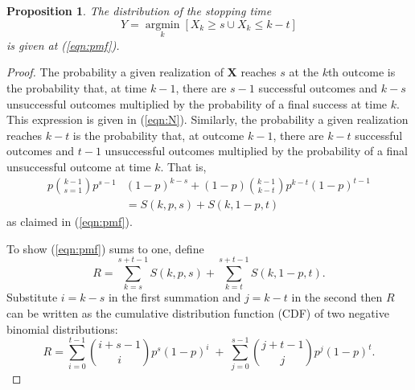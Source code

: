 \documentclass[12pt]{article}
\DeclareMathOperator*{\argmin}{argmin}
\newcommand*{\argminl}{\argmin\limits}
\newtheorem{prop}{Proposition}
\begin{document}
\begin{prop}
The distribution of the stopping time
\begin{equation*}
Y = \argminl_k \left[X_k \geq s \cup X_k \leq k-t \right]
\end{equation*}
is given at (\ref{eqn:pmf}).
\end{prop}
\begin{proof}

The probability a given realization of $\mathbf{X}$ reaches $s$ at
the $k$th outcome is the probability that, at time $k-1$, there are $s-1$
successful outcomes and $k-s$ unsuccessful outcomes multiplied by
the probability of a final success at time $k$. This expression is given
in (\ref{eqn:N}). 
Similarly, the probability a given realization reaches $k-t$
is the probability that, at outcome $k-1$, there are $k-t$ successful outcomes
and $t-1$ unsuccessful outcomes multiplied by the probability of a final
unsuccessful outcome at time $k$. That is,
\begin{align*}
p {k-1 \choose s=1} p^{s-1} & (1-p)^{k-s} + (1-p) {k-1 \choose k-t} p^{k-t} (1-p)^{t-1} \\ 
& = S(k, p, s) + S(k, 1-p, t)
\end{align*}
as claimed in (\ref{eqn:pmf}).


To show (\ref{eqn:pmf}) sums to one, define
\begin{equation*} 
R = \sum_{k=s}^{s+t-1} S(k, p, s) + \sum_{k=t}^{s+t-1} S(k, 1-p, t).
\end{equation*}
Substitute $i=k-s$ in the first summation and $j=k-t$ in the second then
$R$ can be written as the cumulative distribution function (CDF) of two
negative binomial distributions:
\begin{equation} \label{eqn:transformed_sum}
R = \sum_{i=0}^{t-1} {i+s-1 \choose i} p^s (1-p)^i \; + \;
\sum_{j=0}^{s-1} {j+t-1 \choose j} p^j (1-p)^t.
\end{equation}


\end{proof}
\end{document}
